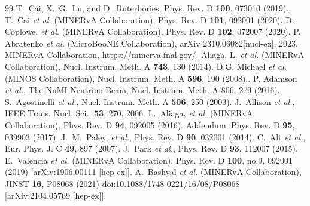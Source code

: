 \begin{thebibliography}{99}
%
T.~Cai, X.~G.~Lu, and D.~Ruterbories,
Phys. Rev. D \textbf{100}, 073010 (2019).
%
T.~Cai {\it et al.} (MINERvA Collaboration), Phys. Rev. D \textbf{101}, 092001 (2020).
%
D. Coplowe, {\it et al.} (MINERvA Collaboration), Phys. Rev. D \textbf{102}, 072007 (2020).
%
P. Abratenko {\it et al.} (MicroBooNE Collaboration), arXiv 2310.06082[nucl-ex], 2023.
%
MINERvA Collaboration,
\url{https://minerva.fnal.gov/}.
%
 Aliaga, L. {\it et al.} (MINERvA Collaboration),
 Nucl. Instrum. Meth. A {\bf 743}, 130 (2014).
%
D.G. Michael {\it et al.} (MINOS Collaboration),
Nucl. Instrum. Meth. A {\bf 596}, 190 (2008)..
%
  P. Adamson {\it et al.}, The NuMI Neutrino
Beam, Nucl. Instrum. Meth. A 806, 279 (2016).
%
S.~Agostinelli {\it et al.}, Nucl. Instrum. Meth. A {\bf 506}, 250 (2003).
%
J.~Allison {\it et al.}, IEEE Trans. Nucl. Sci., {\bf 53}, 270, 2006.
%
L.~Aliaga, {\it et al.} (MINERvA Collaboration), Phys. Rev. D \textbf{94}, 092005 (2016).
 Addendum: Phys. Rev. D \textbf{95}, 039903 (2017).
%
J.~M.~Paley, {\it et al.}, Phys. Rev. D \textbf{90}, 032001 (2014). 
%
C.~Alt {\it et al.}, Eur. Phys. J. C {\bf 49}, 897 (2007).
%
J.~Park {\it et al.}, Phys. Rev. D \textbf{93}, 112007 (2015).
%
E.~Valencia \textit{et al.} (MINERvA Collaboration),
Phys. Rev. D \textbf{100}, no.9, 092001 (2019)
[arXiv:1906.00111 [hep-ex]].
A.~Bashyal \textit{et al.} (MINERvA Collaboration),
JINST \textbf{16}, P08068 (2021)
doi:10.1088/1748-0221/16/08/P08068
[arXiv:2104.05769 [hep-ex]].


\end{thebibliography}
